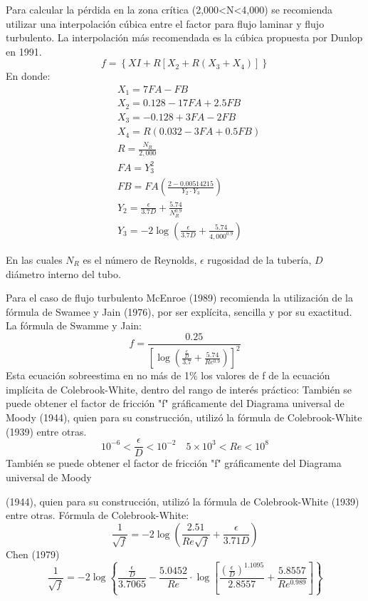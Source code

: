 Para calcular la pérdida en la zona crítica (2,000<N<4,000) se recomienda utilizar una interpolación cúbica entre el factor para flujo laminar y flujo turbulento. La interpolación más recomendada es la cúbica propuesta por Dunlop en 1991.
\begin{equation}
    f =\left\{XI + R\left[X_2 + R\left(X_3 + X_4\right)\right]\right\}
\end{equation}
En donde:
\begin{align*}
    &X_1 = 7FA-FB\\
    &X_2 = 0.128 -17FA + 2.5FB\\
    &X_3 = -0.128 + 3FA - 2FB\\
    &X_4 = R\left(0.032 - 3FA + 0.5FB\right)\\
    &R = \frac{N_R}{2,000}\\
    &FA = Y_3^2\\
    &FB = FA\left(\frac{2 - 0.00514215}{Y_2\cdot Y_3}\right)\\
    &Y_2 = \frac{\epsilon}{3.7D} + \frac{5.74}{N_R^{0.9}}\\ 
    &Y_3 = -2\log{\left(\frac{\epsilon}{3.7D} + \frac{5.74}{4,000^{0.9}}\right)}
\end{align*}

En las cuales $N_R$ es el número de Reynolds, $\epsilon$ rugosidad de la tubería, $D$ diámetro interno del tubo.

Para el caso de flujo turbulento McEnroe (1989) recomienda la utilización de la fórmula de Swamee y Jain (1976), por ser explícita, sencilla y por su exactitud. La fórmula de Swamme y Jain:
\begin{equation}
    f = \frac{0.25}{\left[\log{\left(\frac{\frac{\epsilon}{D}}{3.7} + \frac{5.74}{Re^{0.9}}\right)}\right]^2}
\end{equation}
Esta ecuación sobreestima en no más de 1\% los valores de f de la ecuación implícita de Colebrook-White, dentro del rango de interés práctico: También se puede obtener el factor de fricción "f" gráficamente del Diagrama universal de Moody (1944), quien para su construcción, utilizó la fórmula de Colebrook-White (1939) entre otras.
\begin{equation}
    10^{ - 6} <\frac{\epsilon}{D} < 10^{ - 2}\quad 5\times 10^3 < Re < 10^8
\end{equation}
También se puede obtener el factor de fricción "f" gráficamente del Diagrama universal de Moody

(1944), quien para su construcción, utilizó la fórmula de Colebrook-White (1939) entre otras.
Fórmula de Colebrook-White:
\begin{equation}
    \frac{1}{\sqrt{f}} =- 2\log{\left(\frac{2.51}{Re \sqrt{f}} +\frac{\epsilon}{3.71D}\right)}
\end{equation}
Chen (1979)
\begin{equation}
    \frac{1}{\sqrt{f}} =- 2\log{\left\{\frac{\frac{\epsilon}{D}}{3.7065} - \frac{5.0452}{Re}\cdot \log{\left[\frac{\left(\frac{\epsilon}{D}\right)^{1.1095}}{2.8557} + \frac{5.8557}{Re^{0.989}}\right]}\right\}}
\end{equation}

